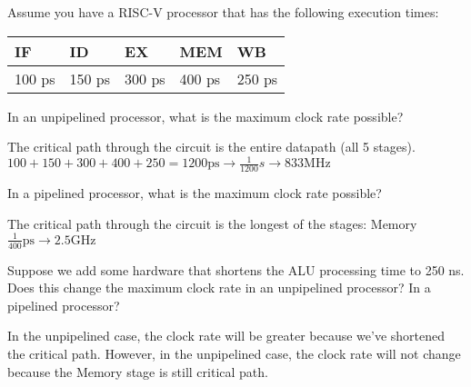 \begin{blocksection}
\question
Assume you have a RISC-V processor that has the following execution times:

\begin{tabular}{ |l|l|l|l|l| } 
 \hline
 IF & ID & EX & MEM & WB \\
 \hline
 100 ps & 150 ps & 300 ps & 400 ps & 250 ps \\
 \hline
\end{tabular}

\begin{parts}
\item In an unpipelined processor, what is the maximum clock rate possible?

\begin{solution}[0.5in]
The critical path through the circuit is the entire datapath (all 5 stages).
$100 + 150 + 300 + 400 + 250 = 1200 \text{ps} \rightarrow \frac{1}{1200} s \rightarrow 833 \text{MHz}$
\end{solution}

\item In a pipelined processor, what is the maximum clock rate possible?

\begin{solution}[0.5in]
The critical path through the circuit is the longest of the stages: Memory
$\frac{1}{400} \text{ps} \rightarrow 2.5 \text{GHz}$
\end{solution}

\item Suppose we add some hardware that shortens the ALU processing time to 250 ns. Does this change the maximum clock rate in an unpipelined processor? In a pipelined processor?

\begin{solution}[0.5in]
In the unpipelined case, the clock rate will be greater because we’ve shortened the critical path. However, in the unpipelined case, the clock rate will not change because the Memory stage is still critical path.
\end{solution}

\end{parts}
\end{blocksection}